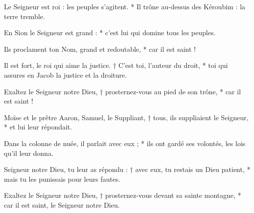 \item Le Seigneur est roi : les peuples s'agitent. * Il trône au-dessus des Kéroubim : la terre tremble.
\item En Sion le Seigneur est grand : * c'est lui qui domine tous les peuples.
\item Ils proclament ton Nom, grand et redoutable, * car il est saint !
\item Il est fort, le roi qui aime la justice. † C'est toi, l'auteur du droit, * toi qui assures en Jacob la justice et la droiture.
\item Exaltez le Seigneur notre Dieu, † prosternez-vous au pied de son trône, * car il est saint !
\item Moïse et le prêtre Aaron, Samuel, le Suppliant, † tous, ils suppliaient le Seigneur, * et lui leur répondait.
\item Dans la colonne de nuée, il parlait avec eux ; * ils ont gardé ses volontés, les lois qu'il leur donna.
\item Seigneur notre Dieu, tu leur as répondu : † avec eux, tu restais un Dieu patient, * mais tu les punissais pour leurs fautes.
\item Exaltez le Seigneur notre Dieu, † prosternez-vous devant sa sainte montagne, * car il est saint, le Seigneur notre Dieu.
